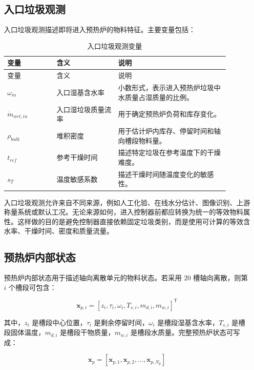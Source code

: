 \documentclass[UTF8,openany,zihao=-4,oneside]{ctexbook}
\begin{document}
\subsection{入口垃圾观测}\label{subsec:feedstock-observation}

入口垃圾观测描述即将进入预热炉的物料特征。主要变量包括：

\begin{longtable}{@{}p{0.20\linewidth}p{0.25\linewidth}p{0.45\linewidth}@{}}
\caption{入口垃圾观测变量}\label{tab:feedstock-vars}\\
\toprule
变量 & 含义 & 说明 \\
\midrule
\endfirsthead
\toprule
变量 & 含义 & 说明 \\
\midrule
\endhead
\(\omega_{in}\) & 入口湿基含水率 & 小数形式，表示进入预热炉垃圾中水质量占湿质量的比例。 \\
\(\dot m_{wet,in}\) & 入口湿垃圾质量流率 & 用于确定预热炉负荷和库存变化。 \\
\(\rho_{bulk}\) & 堆积密度 & 用于估计炉内库存、停留时间和轴向槽段物料量。 \\
\(t_{ref}\) & 参考干燥时间 & 描述特定垃圾在参考温度下的干燥难度。 \\
\(s_T\) & 温度敏感系数 & 描述干燥时间随温度变化的敏感性。 \\
\bottomrule
\end{longtable}

入口垃圾观测允许来自不同来源，例如人工化验、在线水分估计、图像识别、上游称量系统或默认工况。无论来源如何，进入控制器前都应转换为统一的等效物料属性。这样做的目的是避免控制器直接依赖固定垃圾类别，而是使用可计算的等效含水率、干燥时间、密度和质量流量。

\subsection{预热炉内部状态}\label{subsec:preheater-internal-state}

预热炉内部状态用于描述轴向离散单元的物料状态。若采用 20 槽轴向离散，则第 \(i\) 个槽段可包含：

\[
\mathbf{x}_{p,i}=\left[z_i,\tau_i,\omega_i,T_{s,i},m_{d,i},m_{w,i}\right]^\mathsf{T}
\]

其中，\(z_i\) 是槽段中心位置，\(\tau_i\) 是剩余停留时间，\(\omega_i\) 是槽段湿基含水率，\(T_{s,i}\) 是槽段固体温度，\(m_{d,i}\) 是槽段干物质量，\(m_{w,i}\) 是槽段水质量。完整预热炉状态可写成：

\[
\mathbf{x}_p=\left[\mathbf{x}_{p,1},\mathbf{x}_{p,2},\ldots,\mathbf{x}_{p,N_p}\right]
\]
\end{document}

